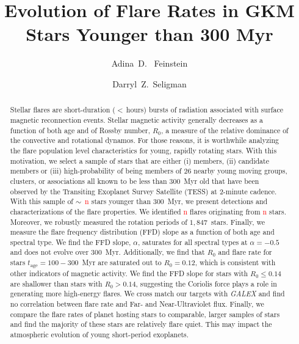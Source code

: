 \documentclass[twocolumn]{aastex631}
\begin{document}
\title{Evolution of Flare Rates in GKM Stars Younger than 300 Myr}

\author{Adina~D.~ Feinstein}

\author[0000-0002-0726-6480]{Darryl~Z.~Seligman}

\begin{abstract}
Stellar flares are short-duration ($<$\,hours) bursts of radiation associated with surface magnetic reconnection events. Stellar magnetic activity  generally decreases as a function of both age and of Rossby number, $R_0$, a measure of the relative dominance of the convective and rotational dynamos. For those reasons, it is worthwhile analyzing the flare population level characteristics for young, rapidly rotating stars. With this motivation, we select a sample of stars that are either (i) members, (ii) candidate members or (iii) high-probability of being  members of 26 nearby young moving groups, clusters, or associations all known to be less than 300~Myr old that have been observed by the Transiting Exoplanet Survey Satellite (TESS) at 2-minute cadence.  With this  sample of $\sim$~\textcolor{red}{n} stars younger than 300~Myr, we present detections and characterizations of the flare properties.  We identified \textcolor{red}{n} flares originating from \textcolor{red}{n} stars. Moreover, we robustly measured the rotation periods of $1,847$~stars. Finally, we measure the flare frequency distribution (FFD) slope as a function of both age and spectral type. We find the FFD slope, $\alpha$, saturates for all spectral types at $\alpha = -0.5$ and does not evolve over 300~Myr. Additionally, we find that $R_0$ and flare rate for stars $t_\textrm{age} = 100 - 300$~Myr are saturated out to $R_0 = 0.12$, which is consistent with other indicators of magnetic activity. We find the FFD slope for stars with $R_0 \leq 0.14$ are shallower than stars with $R_0 > 0.14$, suggesting the Coriolis force plays a role in generating more high-energy flares. We cross match our targets with \textit{GALEX} and find no correlation between flare rate and Far- and Near-Ultraviolet flux. Finally, we compare the flare rates of planet hosting stars to comparable, larger samples of stars and find the majority of these stars are relatively flare quiet. This may impact the atmospheric evolution of young short-period exoplanets.

\end{abstract}
\end{document}
